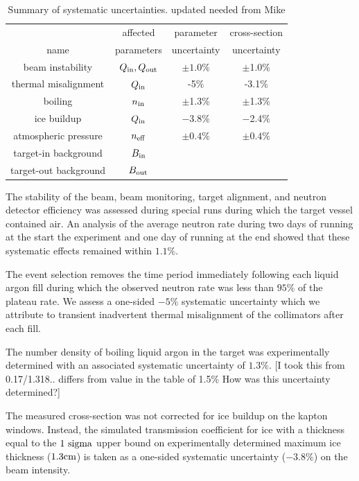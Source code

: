 \documentclass[%
 reprint,
superscriptaddress,
 preprintnumbers,
 nofootinbib,
 nobibnotes,
 bibnotes,
 amsmath,amssymb,
 aps,
 prl, 
 floatfix,
]{revtex4-1}
\begin{document}
\begin{table}[h!]
    \centering
    \begin{tabular}{|c|c|c|c|}
\hline
& affected & parameter & cross-section  \\
    name & parameters & uncertainty & uncertainty \\ \hline        
beam instability & $Q_{\rm in}, Q_{\rm out}$ & $\pm 1.0\%$ & $\pm$1.0\%\\   
thermal misalignment & $Q_{\rm in}$ & -5\% & -3.1\% \\
boiling & $n_{\rm in}$ & $\pm$1.3\% & $\pm$1.3\%\\
ice buildup & $Q_{\rm in}$ & $-$3.8\% & $-$2.4\%\\   
atmospheric pressure & $n_{\rm eff}$ & $\pm 0.4\%$ & $\pm 0.4\%$ \\
target-in background & $B_{\rm in}$ & & \\
target-out background & $B_{\rm out}$ & & \\
\hline
    \end{tabular}
    \caption{Summary of systematic uncertainties. {\color{red} updated needed from Mike}}
    \label{tab:uncertainties}
\end{table}

The stability of the beam, beam monitoring, target alignment, and
neutron detector efficiency was assessed during special runs during
which the target vessel contained air.  An analysis of the average
neutron rate during two days of running at the start the experiment
and one day of running at the end showed that these systematic effects
remained within $1.1\%$.

The event selection removes the time period immediately following each
liquid argon fill during which the observed neutron rate was less than
$95\%$ of the plateau rate.  We assess a one-sided $-5\%$ systematic
uncertainty which we attribute to transient inadvertent thermal
misalignment of the collimators after each fill.

The number density of boiling liquid argon in the target was
experimentally determined with an associated systematic uncertainty of
$1.3\%$.  {\color{red} [I took this from 0.17/1.318.. differs from value in the table of 1.5\%  How was this uncertainty determined?]}

The measured cross-section was not corrected for ice buildup on the
kapton windows.  Instead, the simulated transmission coefficient for
ice with a thickness equal to the $1~\rm sigma$ upper bound on
experimentally determined maximum ice thickness ($1.3 \rm cm$) is
taken as a one-sided systematic uncertainty ($-3.8\%$) on the beam
intensity.
  
\end{document}
